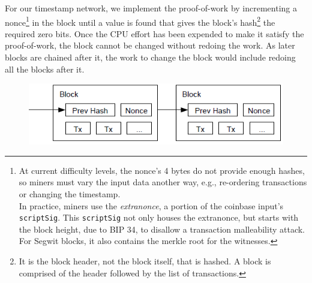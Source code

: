 \documentclass[nohyper]{tufte-handout}
\begin{document}
For our timestamp network, we implement the proof-of-work by
incrementing a nonce\footnote[][-1.3in]{At current difficulty levels, the nonce's 4 bytes do not provide enough hashes, so miners must vary the input data another way, e.g., re-ordering transactions or changing the timestamp.\\In practice, miners use the \emph{extranonce}, a portion of the coinbase input's \texttt{scriptSig}.  This \texttt{scriptSig} not only houses the extranonce, but starts with the block height, due to BIP 34, to disallow a transaction malleability attack.  For Segwit blocks, it also contains the merkle root for the witnesses.} in the block until a value is found that gives the
block's hash\footnote[][0.1in]{It is the block header, not the block itself, that is hashed.  A block is comprised of the header followed by the list of transactions.}
the required zero bits. Once the CPU effort has been
expended to make it satisfy the proof-of-work, the block cannot be
changed without redoing the work. As later blocks are chained after it,
the work to change the block would include redoing all the blocks after
it.



\begin{figure}[!h]
\centering
\includegraphics[width=0.75\linewidth]{proof-of-work.png}
\end{figure}
\end{document}
